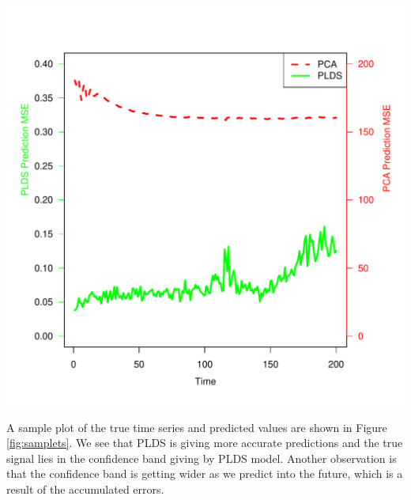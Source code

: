 \documentclass[fleqn]{article}
\let\oldref\ref
\renewcommand{\ref}[1]{(\oldref{#1})}
\begin{document}
\begin{center}
\includegraphics[scale=0.5]{./figures/hcp_pred_accy.pdf}
\label{fig:predaccy}
\end{center}

A sample plot of the true time series and predicted values are shown in Figure \oldref{fig:samplets}. We see that PLDS is giving more accurate predictions and the true signal lies in the confidence band giving by PLDS model. Another observation is that the confidence band is getting wider as we predict into the future, which is a result of the accumulated errors.
\end{document}
